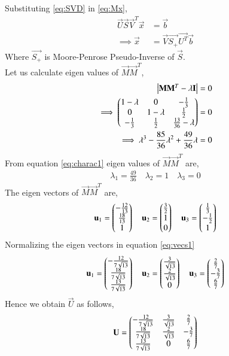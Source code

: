 \documentclass[journal,12pt,twocolumn]{IEEEtran}
\begin{document}
Substituting \eqref{eq:SVD} in \eqref{eq:Mx},
\begin{align}
\vec{U}\vec{S}\vec{V}^T\vec{x} & = \vec{b}\\
\implies\vec{x} &= \vec{V}\vec{S_+}\vec{U^T}\vec{b}\label{eq:x}
\end{align}
Where $\vec{S_+}$ is Moore-Penrose Pseudo-Inverse of $\vec{S}$. \\
Let us calculate eigen values of $\vec{M}\vec{M}^T$,
\begin{align}
\begin{vmatrix}\mathbf{M}\mathbf{M}^T - \lambda\mathbf{I}\end{vmatrix} &= 0\\
\implies\begin{pmatrix}1-\lambda&0&-\frac{1}{3}\\0&1-\lambda&\frac{1}{2}\\-\frac{1}{3}&\frac{1}{2}&\frac{13}{36}-\lambda\end{pmatrix} &=0\\
\implies\lambda^3-\frac{85}{36}\lambda^2+\frac{49}{36}\lambda &=0 \label{eq:charac1}
\end{align}
From equation \eqref{eq:charac1} eigen values of $\vec{M}\vec{M}^T$ are,
\begin{align}
\lambda_1 = \frac{49}{36} \quad
\lambda_2 = 1 \quad
\lambda_3 = 0
\end{align}
The eigen vectors of $\vec{M}\vec{M}^T$ are,
\begin{align}
\mathbf{u}_1=\begin{pmatrix}-\frac{12}{13}\\\frac{18}{13}\\1\end{pmatrix}\quad
\mathbf{u}_2=\begin{pmatrix}\frac{3}{2}\\1\\0\end{pmatrix}\quad
\mathbf{u}_3=\begin{pmatrix}\frac{1}{3}\\-\frac{1}{2}\\1\end{pmatrix}\label{eq:vecs1}
\end{align}
Normalizing the eigen vectors in equation \eqref{eq:vecs1}
\begin{align}
\mathbf{u}_1=\begin{pmatrix}-\frac{12}{7\sqrt{13}}\\\frac{18}{7\sqrt{13}}\\\frac{13}{7\sqrt{13}}\end{pmatrix}\quad
\mathbf{u}_2=\begin{pmatrix}\frac{3}{\sqrt{13}}\\\frac{2}{\sqrt{13}}\\0\end{pmatrix}\quad
\mathbf{u}_3=\begin{pmatrix}\frac{2}{7}\\-\frac{3}{7}\\\frac{6}{7}\end{pmatrix}
\end{align}
Hence we obtain $\vec{U}$ as follows,
\begin{align}
\mathbf{U}=\begin{pmatrix}-\frac{12}{7\sqrt{13}}&\frac{3}{\sqrt{13}}&\frac{2}{7}\\\frac{18}{7\sqrt{13}}&\frac{2}{\sqrt{13}}&-\frac{3}{7}\\\frac{13}{7\sqrt{13}}&0&\frac{6}{7}\end{pmatrix}\label{eq:U}
\end{align}
\end{document}
